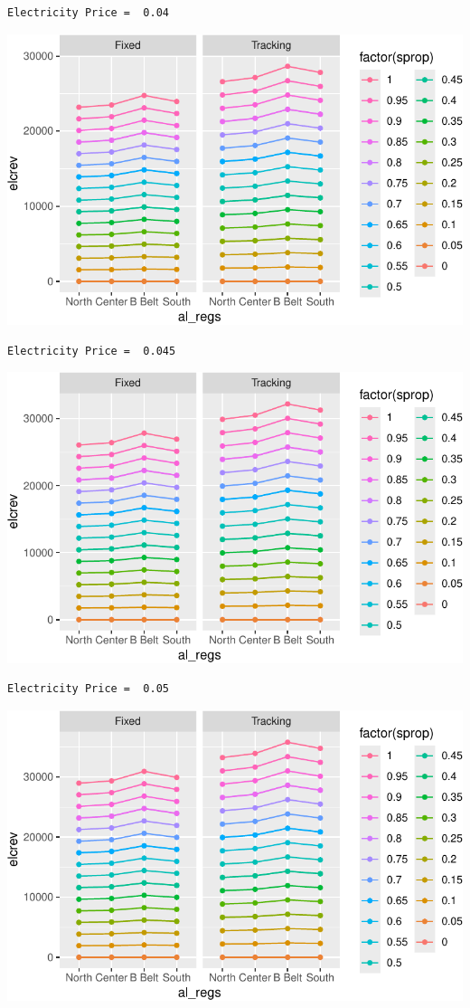 \documentclass[
  letterpaper,
  DIV=11,
  numbers=noendperiod]{scrartcl}
\begin{document}
\begin{verbatim}
Electricity Price =  0.04
\end{verbatim}

\includegraphics{Simulation_files/figure-pdf/unnamed-chunk-21-7.pdf}

\begin{verbatim}
Electricity Price =  0.045
\end{verbatim}

\includegraphics{Simulation_files/figure-pdf/unnamed-chunk-21-8.pdf}

\begin{verbatim}
Electricity Price =  0.05
\end{verbatim}

\includegraphics{Simulation_files/figure-pdf/unnamed-chunk-21-9.pdf}
\end{document}
